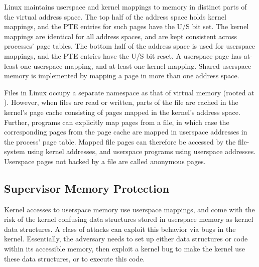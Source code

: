 \documentclass[letterpaper,twocolumn,10pt, anonymous]{article}
\begin{document}
Linux maintains userspace and kernel mappings to memory in distinct 
parts of the virtual address space. 
The top half of the address space holds kernel mappings, and the 
PTE entries for such pages have the U/S bit set. 
The kernel mappings are identical for all address spaces, and are 
kept consistent across processes' page tables.
The bottom half of the address space is used for userspace mappings, 
and the PTE entries have the U/S bit reset.
A userspace page has at-least one userspace mapping, and at-least one
kernel mapping.
Shared userspace memory is implemented by mapping a page in more than 
one address space.

Files in Linux occupy a separate namespace as that of virtual memory
(rooted at \Code{/}).
However, when files are read or written, parts of the file are cached
in the kernel's page cache consisting of pages mapped in the kernel's 
address space.
Further, programs can explicitly map pages from a file, in which case 
the corresponding pages from the page cache are mapped in userspace 
addresses in the process' page table.
Mapped file pages can therefore be accessed by the file-system using 
kernel addresses, and userspace programs using userspace addresses.
Userspace pages not backed by a file are called anonymous pages.


\subsection{Supervisor Memory Protection} %

Kernel accesses to userspace memory use userspace mappings, and 
come with the risk of the kernel confusing data structures 
stored in userspace memory as kernel data structures.
A class of attacks can exploit this behavior via bugs in the 
kernel.
Essentially, the adversary needs to set up either data structures
or code within its accessible memory, then exploit a kernel 
bug to make the kernel use these data structures, or to execute 
this code.
\end{document}
